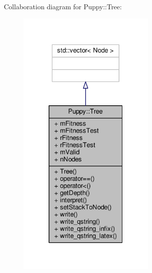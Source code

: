 Collaboration diagram for Puppy\+:\+:Tree\+:
\nopagebreak
\begin{figure}[H]
\begin{center}
\leavevmode
\includegraphics[width=193pt]{classPuppy_1_1Tree__coll__graph}
\end{center}
\end{figure}
